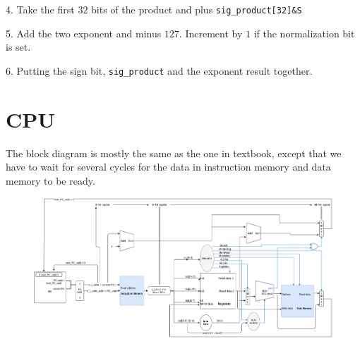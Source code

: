 \documentclass[11pt,a4paper]{article}
\begin{document}
4. Take the first $32$ bits of the product and plus  \texttt{sig\_product[32]\&S}\n

5. Add the two exponent and minus $127$. Increment by  $1$ if the normalization bit is set.\n 

6. Putting the sign bit, \texttt{sig\_product} and the exponent result together.
\section{CPU}%
\label{sec:CPU}
    
    The block diagram is mostly the same as the one in textbook, except that we have to wait for several cycles for the data in instruction memory and data memory to be ready. 
    \begin{figure}[htpb]
        \centering
        \includegraphics[width=1.0\textwidth]{../CPU_block_diagram.png}
    \end{figure}
\end{document}
